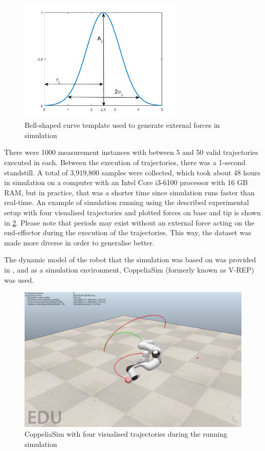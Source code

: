 \begin{figure}
    \centering
    \includegraphics[width=0.7\textwidth]{slike/bell.png}
    \caption{Bell-shaped curve template used to generate external forces in simulation}
    \label{fig:Bell}
\end{figure}

There were 1000 measurement instances with between 5 and 50 valid trajectories executed in each. Between the execution of trajectories, there was a 1-second standstill. A total of 3,919,800 samples were collected, which took about 48 hours in simulation on a computer with an Intel Core i3-6100 processor with 16 GB RAM, but in practice, that was a shorter time since simulation runs faster than real-time. An example of simulation running using the described experimental setup with four visualised trajectories and plotted forces on base and tip is shown in \cref{fig:Coppelia}. Please note that periods may exist without an external force acting on the end-effector during the execution of the trajectories. This way, the dataset was made more diverse in order to generalise better. 

The dynamic model of the robot that the simulation was based on was provided in \cite{Gaz2019}, and as a simulation environment, CoppeliaSim (formerly known as V-REP) \cite{Rohmer2013} was used.

\begin{figure}
    \centering
    \includegraphics{slike/mdpi/coppelia_crop.png}
    \caption{CoppeliaSim with four visualised trajectories during the running simulation}
    \label{fig:Coppelia}
\end{figure}

